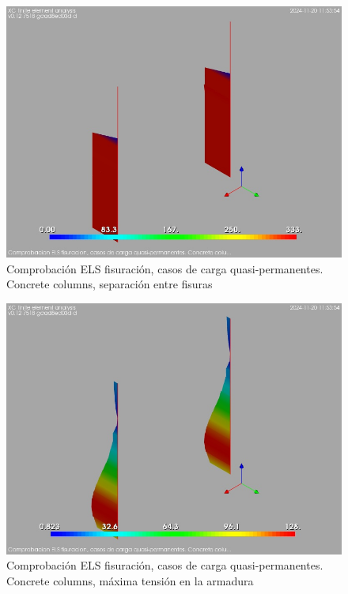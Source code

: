 \begin{figure}[ht]
\begin{center}
\includegraphics[width=\linewidth]{results/graphics/crackingSLS_qperm/columnZconcrs_rmax}
\caption{Comprobación ELS fisuración, casos de carga quasi-permanentes. Concrete columns, separación entre fisuras}
\label{SLS_quasiPermanentLoadsCrackControlcolumnZconcrs_rmax}
\end{center}
\end{figure}
\begin{figure}[ht]
\begin{center}
\includegraphics[width=\linewidth]{results/graphics/crackingSLS_qperm/columnZconcrsigma_s}
\caption{Comprobación ELS fisuración, casos de carga quasi-permanentes. Concrete columns, máxima tensión en la armadura}
\label{SLS_quasiPermanentLoadsCrackControlcolumnZconcrsigma_s}
\end{center}
\end{figure}
